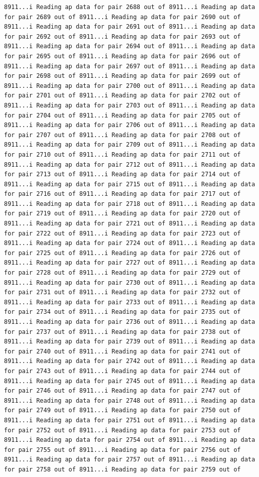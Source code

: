 \documentclass[
]{article}
\begin{document}
\begin{verbatim}
8911...i Reading ap data for pair 2688 out of 8911...i Reading ap data for pair 2689 out of 8911...i Reading ap data for pair 2690 out of 8911...i Reading ap data for pair 2691 out of 8911...i Reading ap data for pair 2692 out of 8911...i Reading ap data for pair 2693 out of 8911...i Reading ap data for pair 2694 out of 8911...i Reading ap data for pair 2695 out of 8911...i Reading ap data for pair 2696 out of 8911...i Reading ap data for pair 2697 out of 8911...i Reading ap data for pair 2698 out of 8911...i Reading ap data for pair 2699 out of 8911...i Reading ap data for pair 2700 out of 8911...i Reading ap data for pair 2701 out of 8911...i Reading ap data for pair 2702 out of 8911...i Reading ap data for pair 2703 out of 8911...i Reading ap data for pair 2704 out of 8911...i Reading ap data for pair 2705 out of 8911...i Reading ap data for pair 2706 out of 8911...i Reading ap data for pair 2707 out of 8911...i Reading ap data for pair 2708 out of 8911...i Reading ap data for pair 2709 out of 8911...i Reading ap data for pair 2710 out of 8911...i Reading ap data for pair 2711 out of 8911...i Reading ap data for pair 2712 out of 8911...i Reading ap data for pair 2713 out of 8911...i Reading ap data for pair 2714 out of 8911...i Reading ap data for pair 2715 out of 8911...i Reading ap data for pair 2716 out of 8911...i Reading ap data for pair 2717 out of 8911...i Reading ap data for pair 2718 out of 8911...i Reading ap data for pair 2719 out of 8911...i Reading ap data for pair 2720 out of 8911...i Reading ap data for pair 2721 out of 8911...i Reading ap data for pair 2722 out of 8911...i Reading ap data for pair 2723 out of 8911...i Reading ap data for pair 2724 out of 8911...i Reading ap data for pair 2725 out of 8911...i Reading ap data for pair 2726 out of 8911...i Reading ap data for pair 2727 out of 8911...i Reading ap data for pair 2728 out of 8911...i Reading ap data for pair 2729 out of 8911...i Reading ap data for pair 2730 out of 8911...i Reading ap data for pair 2731 out of 8911...i Reading ap data for pair 2732 out of 8911...i Reading ap data for pair 2733 out of 8911...i Reading ap data for pair 2734 out of 8911...i Reading ap data for pair 2735 out of 8911...i Reading ap data for pair 2736 out of 8911...i Reading ap data for pair 2737 out of 8911...i Reading ap data for pair 2738 out of 8911...i Reading ap data for pair 2739 out of 8911...i Reading ap data for pair 2740 out of 8911...i Reading ap data for pair 2741 out of 8911...i Reading ap data for pair 2742 out of 8911...i Reading ap data for pair 2743 out of 8911...i Reading ap data for pair 2744 out of 8911...i Reading ap data for pair 2745 out of 8911...i Reading ap data for pair 2746 out of 8911...i Reading ap data for pair 2747 out of 8911...i Reading ap data for pair 2748 out of 8911...i Reading ap data for pair 2749 out of 8911...i Reading ap data for pair 2750 out of 8911...i Reading ap data for pair 2751 out of 8911...i Reading ap data for pair 2752 out of 8911...i Reading ap data for pair 2753 out of 8911...i Reading ap data for pair 2754 out of 8911...i Reading ap data for pair 2755 out of 8911...i Reading ap data for pair 2756 out of 8911...i Reading ap data for pair 2757 out of 8911...i Reading ap data for pair 2758 out of 8911...i Reading ap data for pair 2759 out of 
\end{verbatim}
\end{document}
